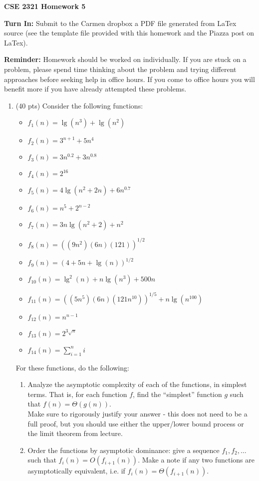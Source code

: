 \documentclass[14pt]{extarticle}
\begin{document}
\textbf{CSE 2321 Homework 5}

\textbf{Turn In:} Submit to the Carmen dropbox a PDF file generated from LaTex source (see the template file provided with this homework and the Piazza post on LaTex).

\textbf{Reminder:} Homework should be worked on individually. If you are stuck on a problem, please spend time thinking about the problem and trying different approaches before seeking help in office hours. If you come to office hours you will benefit more if you have already attempted these problems. 

\begin{enumerate}

\item (40 pts) Consider the following functions:
\begin{itemize}
\item $f_1(n) = \lg(n^3) + \lg(n^2)$
\item $f_2(n) = 3^{n+1} + 5n^{4}$
\item $f_3(n) = 3n^{0.2} + 3n^{0.8}$
\item $f_4(n) = 2^{16}$
\item $f_5(n) = 4 \lg(n^2+2n) + 6n^{0.7}$
\item $f_6(n) = n^5 + 2^{n-2}$
\item $f_7(n) = 3 n \lg(n^2 + 2) + n^2$
\item $f_8(n) = ((9n^2)(6n)(121))^{1/2}$
\item $f_9(n) = (4 + 5n + \lg(n))^{1/2}$
\item $f_{10}(n) = \lg^2(n) + n\lg(n^3) + 500n$
\item $f_{11}(n) = ((5n^5)(6n)(121n^{10}))^{1/5} + n\lg(n^{100})$
\item $f_{12}(n) = n^{n-1}$
\item $f_{13}(n) = 2^{3\sqrt{n}}$
\item $f_{14}(n) = \sum_{i=1}^{n} i$
\end{itemize}
For these functions, do the following:
\begin{enumerate}
\item Analyze the asymptotic complexity of each of the functions, in simplest terms. That is, for each function $f$, find the ``simplest'' function $g$ such that $f(n) = \Theta(g(n))$.\\
Make sure to rigorously justify your answer - this does not need to be a full proof, but you should use either the upper/lower bound process or the limit theorem from lecture.
\item Order the functions by asymptotic dominance: give a sequence $f_1, f_2, \ldots$ such that $f_i(n) = O(f_{i+1}(n))$. Make a note if any two functions are asymptotically equivalent, i.e. if $f_i(n) = \Theta(f_{i+1}(n))$.
\end{enumerate}





\end{enumerate}
\end{document}
